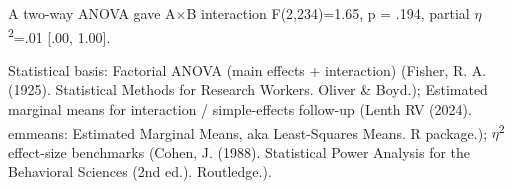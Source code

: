 \documentclass{article}
\begin{document}
A two-way ANOVA gave A$\times$B interaction F(2,234)=1.65, p = .194, partial $\eta$\textsuperscript{2}=.01 [.00, 1.00].

Statistical basis: Factorial ANOVA (main effects + interaction) (Fisher, R. A. (1925). Statistical Methods for Research Workers. Oliver \& Boyd.); Estimated marginal means for interaction / simple-effects follow-up (Lenth RV (2024). emmeans: Estimated Marginal Means, aka Least-Squares Means. R package.); $\eta$\textsuperscript{2} effect-size benchmarks (Cohen, J. (1988). Statistical Power Analysis for the Behavioral Sciences (2nd ed.). Routledge.).
\end{document}
